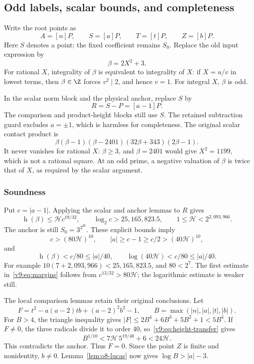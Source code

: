 \subsection{Odd labels, scalar bounds, and completeness}\label{v9:sec:labels}
Write the root points as
\[
 A=[n]P,\qquad S=[a]P,\qquad T=[t]P,\qquad Z=[b]P.
\]
Here $S$ denotes a point; the fixed coefficient remains $S_0$. Replace the old input expression by
\[
 \beta=2X^2+3.
\]
For rational $X$, integrality of $\beta$ is equivalent to integrality of $X$: if $X=u/v$ in lowest terms, then $\beta\in\Z$ forces $v^2\mid2$, and hence $v=1$. For integral $X$, $\beta$ is odd.

In the scalar norm block and the physical anchor, replace $S$ by
\[
 R=S-P=[a-1]P.
\]
The comparison and product-height blocks still use $S$. The retained subtraction guard excludes $a=\pm1$, which is harmless for completeness. The original scalar contact product is
\[
 \beta(\beta-1)(\beta-2401)(32\beta+343)(2\beta-1).
\]
It never vanishes for rational $X$: $\beta\ge3$, and $\beta=2401$ would give $X^2=1199$, which is not a rational square. At an odd prime, a negative valuation of $\beta$ is twice that of $X$, as required by the scalar argument.

\subsubsection{Soundness}\label{subsec:v9-soundness}
Put $c=|a-1|$. Applying the scalar and anchor lemmas to $R$ gives
\[
 \operatorname{h}(\beta)\le\mathcal H c^{19/32},\qquad
 \log_2c>25{,}165{,}823.5,
 \qquad 1\le\mathcal H<2^{2{,}093{,}966}.
\]
The anchor is still $S_0=3^{2^{26}}$. These explicit bounds imply
\[
 c>(80\mathcal H)^{10},\qquad
 |a|\ge c-1\ge c/2>(40\mathcal H)^{10},
\]
and
\begin{equation}\label{v9:eq:margins}
 \operatorname{h}(\beta)<c/80\le |a|/40,
 \qquad\log(40\mathcal H)<c/80\le |a|/40.
\end{equation}
For example $10(7+2{,}093{,}966)<25{,}165{,}823.5$, and $80<2^7$. The first estimate in~\eqref{v9:eq:margins} follows from $c^{13/32}>80\mathcal H$; the logarithmic estimate is weaker still.

The local comparison lemmas retain their original conclusions. Let
\[
 F=t^2-a(a-2)tb+(a-2)^2b^2-1,
 \qquad B=\max(|n|,|a|,|t|,|b|).
\]
For $B>4$, the triangle inequality gives $|F|\le2B^4+6B^3+5B^2+1<5B^4$. If $F\ne0$, the three radicals divide it to order 40, so~\eqref{v9:eq:height-transfer} gives
\[
 B^{1/10}<7\mathcal H\,5^{19/40}+6<24\mathcal H.
\]
This contradicts the anchor. Thus $F=0$. Since the point $Z$ is finite and nonidentity, $b\ne0$. Lemma~\ref{lem:o8-lucas} now gives $\log B>|a|-3$.

